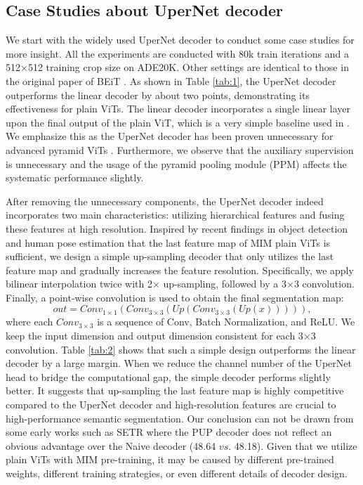\documentclass{article} \usepackage{iclr2024_conference,times}
\begin{document}
\subsection{Case Studies about UperNet decoder}

We start with the widely used UperNet decoder to conduct some case studies for more insight. All the experiments are conducted with 80k train iterations and a 512$\times$512 training crop size on ADE20K. Other settings are identical to those in the original paper of BEiT \citep{bao2022beit}. As shown in Table \ref{tab:1}, the UperNet decoder outperforms the linear decoder by about two points, demonstrating its effectiveness for plain ViTs. The linear decoder incorporates a single linear layer upon the final output of the plain ViT, which is a very simple baseline used in \citep{strudel2021segmenter}. We emphasize this as the UperNet decoder has been proven unnecessary for advanced pyramid ViTs \citep{xie2021segformer,gu2022multi}. Furthermore, we observe that the auxiliary supervision is unnecessary and the usage of the pyramid pooling module (PPM) affects the systematic performance slightly.

After removing the unnecessary components, the UperNet decoder indeed incorporates two main characteristics: utilizing hierarchical features and fusing these features at high resolution. Inspired by recent findings in object detection and human pose estimation that the last feature map of MIM plain ViTs is sufficient\citep{li2022exploring,xu2022vitpose}, we design a simple up-sampling decoder that only utilizes the last feature map and gradually increases the feature resolution. Specifically, we apply bilinear interpolation twice with 2$\times$ up-sampling, followed by a 3$\times$3 convolution. Finally, a point-wise convolution is used to obtain the final segmentation map:
\begin{equation}
out = Conv_{1\times1}(Conv_{3\times3}(Up(Conv_{3\times3}(Up(x))))),
\label{eq2}
\end{equation}
where each $Conv_{3\times3}$ is a sequence of Conv, Batch Normalization, and ReLU. We keep the input dimension and output dimension consistent for each 3$\times$3 convolution. Table \ref{tab:2} shows that such a simple design outperforms the linear decoder by a large margin. When we reduce the channel number of the UperNet head to bridge the computational gap, the simple decoder performs slightly better. It suggests that up-sampling the last feature map is highly competitive compared to the UperNet decoder and high-resolution features are crucial to high-performance semantic segmentation. Our conclusion can not be drawn from some early works such as SETR where the PUP decoder does not reflect an obvious advantage over the Naive decoder (48.64 $vs.$ 48.18). Given that we utilize plain ViTs with MIM pre-training, it may be caused by different pre-trained weights, different training strategies, or even different details of decoder design.
\end{document}
